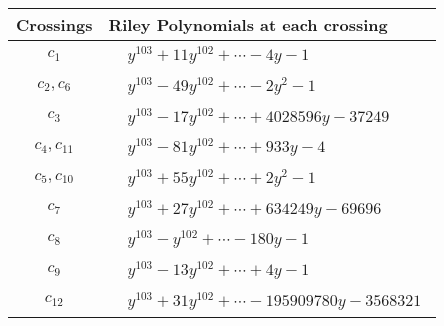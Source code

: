 \documentclass[1p]{elsarticle_modified}
\theoremstyle{definition}
\begin{document}
\begin{tabular}{m{50pt}|m{274pt}}
Crossings & \hspace{64pt}Riley Polynomials at each crossing \\
\hline $$\begin{aligned}c_{1}\end{aligned}$$&$\begin{aligned}
&y^{103}+11 y^{102}+\cdots-4 y-1
\end{aligned}$\\
\hline $$\begin{aligned}c_{2},c_{6}\end{aligned}$$&$\begin{aligned}
&y^{103}-49 y^{102}+\cdots-2 y^2-1
\end{aligned}$\\
\hline $$\begin{aligned}c_{3}\end{aligned}$$&$\begin{aligned}
&y^{103}-17 y^{102}+\cdots+4028596 y-37249
\end{aligned}$\\
\hline $$\begin{aligned}c_{4},c_{11}\end{aligned}$$&$\begin{aligned}
&y^{103}-81 y^{102}+\cdots+933 y-4
\end{aligned}$\\
\hline $$\begin{aligned}c_{5},c_{10}\end{aligned}$$&$\begin{aligned}
&y^{103}+55 y^{102}+\cdots+2 y^2-1
\end{aligned}$\\
\hline $$\begin{aligned}c_{7}\end{aligned}$$&$\begin{aligned}
&y^{103}+27 y^{102}+\cdots+634249 y-69696
\end{aligned}$\\
\hline $$\begin{aligned}c_{8}\end{aligned}$$&$\begin{aligned}
&y^{103}- y^{102}+\cdots-180 y-1
\end{aligned}$\\
\hline $$\begin{aligned}c_{9}\end{aligned}$$&$\begin{aligned}
&y^{103}-13 y^{102}+\cdots+4 y-1
\end{aligned}$\\
\hline $$\begin{aligned}c_{12}\end{aligned}$$&$\begin{aligned}
&y^{103}+31 y^{102}+\cdots-195909780 y-3568321
\end{aligned}$\\
\hline
\end{tabular}\\~\\
\end{document}
